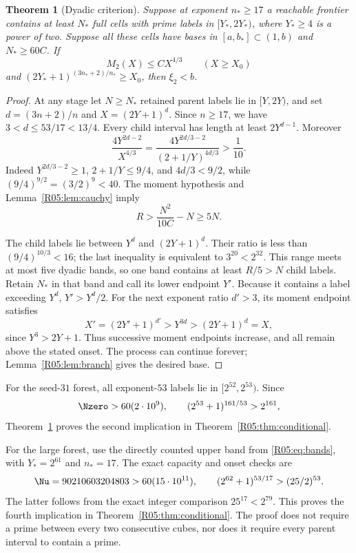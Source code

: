 \documentclass[11pt,a4paper]{article}
\newtheorem{theorem}{Theorem}[section]
\theoremstyle{definition}\newtheorem{definition}[theorem]{Definition}
\theoremstyle{remark}\newtheorem{remark}[theorem]{Remark}
\begin{document}
\begin{theorem}[Dyadic criterion]\label{R05:thm:dyadic}
Suppose at exponent $n_*\ge17$ a reachable frontier contains at least
$N_*$ full cells with prime labels in $[Y_*,2Y_*)$, where $Y_*\ge4$
is a power of two. Suppose all these cells have bases in
$[a,b_*]\subset(1,b)$ and $N_*\ge60C$.
If
\[
 M_2(X)\le C X^{4/3}\qquad(X\ge X_0)
\]
and $(2Y_*+1)^{(3n_*+2)/n_*}\ge X_0$, then $\xi_2<b$.
\end{theorem}
\begin{proof}
At any stage let $N\ge N_*$ retained parent labels lie in $[Y,2Y)$,
and set $d=(3n+2)/n$ and $X=(2Y+1)^d$.
Since $n\ge17$, we have $3<d\le53/17<13/4$.
Every child interval has length at least $2Y^{d-1}$.
Moreover
\begin{equation}\label{R05:eq:criticalratio}
 \frac{4Y^{2d-2}}{X^{4/3}}
 =\frac{4Y^{2d/3-2}}{(2+1/Y)^{4d/3}}>\frac1{10}.
\end{equation}
Indeed $Y^{2d/3-2}\ge1$, $2+1/Y\le9/4$, and
$4d/3<9/2$, while $(9/4)^{9/2}=(3/2)^9<40$.
The moment hypothesis and Lemma~\ref{R05:lem:cauchy} imply
\begin{equation}\label{R05:eq:Rdyadic}
 R>\frac{N^2}{10C}-N\ge5N.
\end{equation}

The child labels lie between $Y^d$ and $(2Y+1)^d$. Their ratio is
less than $(9/4)^{10/3}<16$; the last inequality is equivalent to
$3^{20}<2^{32}$. This range meets at most five dyadic bands, so one
band contains at least $R/5>N$ child labels. Retain $N_*$ in that
band and call its lower endpoint $Y'$.
Because it contains a label exceeding $Y^d$, $Y'>Y^d/2$.
For the next exponent ratio $d'>3$, its moment endpoint satisfies
\[
 X'=(2Y'+1)^{d'}>Y^{3d}>(2Y+1)^d=X,
\]
since $Y^3>2Y+1$. Thus successive moment endpoints increase, and
all remain above the stated onset. The process can continue forever;
Lemma~\ref{R05:lem:branch} gives the desired base.
\end{proof}

For the seed-$31$ forest, all exponent-$53$ labels lie in
$[2^{52},2^{53})$. Since
\[
 \Nzero>60(2\cdot10^9),\qquad
 (2^{53}+1)^{161/53}>2^{161},
\]
Theorem~\ref{R05:thm:dyadic} proves the second implication in
Theorem~\ref{R05:thm:conditional}.

For the large forest, use the directly counted upper band from
\eqref{R05:eq:bands}, with $Y_*=2^{61}$ and $n_*=17$.
The exact capacity and onset checks are
\begin{equation}\label{R05:eq:upperchecks}
 \Nu=90210603204803>60(15\cdot10^{11}),\qquad
 (2^{62}+1)^{53/17}>(25/2)^{53}.
\end{equation}
The latter follows from the exact integer comparison $25^{17}<2^{79}$.
This proves the fourth implication in Theorem~\ref{R05:thm:conditional}.
The proof does not require a prime between every two consecutive
cubes, nor does it require every parent interval to contain a prime.
\end{document}
